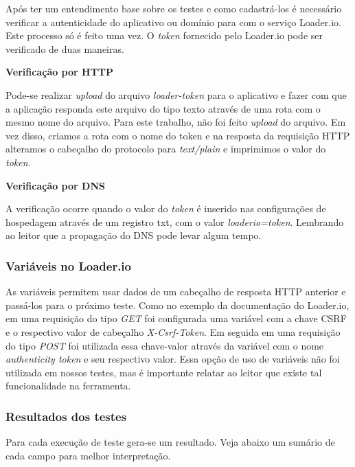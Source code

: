  Após ter um entendimento base sobre os testes e como cadastrá-los é necessário verificar a autenticidade do 
  aplicativo ou domínio para com o serviço Loader.io. Este processo só é feito uma vez. 
  O \textit{token} fornecido pelo Loader.io pode ser verificado de duas maneiras.
  
  \textbf{Verificação por HTTP}
  
  Pode-se realizar \textit{upload} do arquivo \textit{loader-token} para o aplicativo e fazer com que a aplicação
  responda este arquivo do tipo texto através de uma rota com o mesmo nome do arquivo. 
  Para este trabalho, não foi feito \textit{upload} do arquivo. Em vez disso, criamos a rota com o nome do token e
  na resposta da requisição \ac{HTTP} alteramos o cabeçalho do protocolo para \textit{text/plain} e imprimimos
  o valor do \textit{token}.
  
  \textbf{Verificação por DNS}
  
  A verificação ocorre quando o valor do \textit{token} é inserido nas configurações de hospedagem através de um
  registro txt, com o valor \textit{loaderio=token}.
  Lembrando ao leitor que a propagação do \ac{DNS} pode levar algum tempo.
  
\subsubsection{Variáveis no Loader.io}

  As variáveis permitem usar dados de um cabeçalho de resposta \ac{HTTP} anterior e passá-los para o próximo
  teste.
  Como no exemplo da documentação do Loader.io, em uma requisição do tipo \textit{GET} foi configurada uma variável
  com a chave CSRF e o respectivo valor de cabeçalho \textit{X-Csrf-Token}. Em seguida em uma requisição 
  do tipo \textit{POST} foi utilizada essa chave-valor através da variável com o nome \textit{authenticity token} e seu respectivo
  valor.
  Essa opção de uso de variáveis não foi utilizada em nossos testes, mas é importante relatar ao leitor que
  existe tal funcionalidade na ferramenta.

  
\subsubsection{Resultados dos testes}

  Para cada execução de teste gera-se um resultado. Veja abaixo um sumário de cada campo para melhor interpretação.
  
